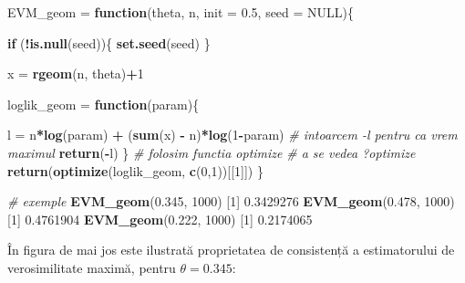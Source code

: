 \documentclass[]{article}
\newenvironment{Shaded}{\begin{snugshade}}{\end{snugshade}}
\newcommand{\KeywordTok}[1]{\textcolor[rgb]{0.13,0.29,0.53}{\textbf{#1}}}
\newcommand{\DataTypeTok}[1]{\textcolor[rgb]{0.13,0.29,0.53}{#1}}
\newcommand{\DecValTok}[1]{\textcolor[rgb]{0.00,0.00,0.81}{#1}}
\newcommand{\FloatTok}[1]{\textcolor[rgb]{0.00,0.00,0.81}{#1}}
\newcommand{\StringTok}[1]{\textcolor[rgb]{0.31,0.60,0.02}{#1}}
\newcommand{\CommentTok}[1]{\textcolor[rgb]{0.56,0.35,0.01}{\textit{#1}}}
\newcommand{\OtherTok}[1]{\textcolor[rgb]{0.56,0.35,0.01}{#1}}
\newcommand{\ControlFlowTok}[1]{\textcolor[rgb]{0.13,0.29,0.53}{\textbf{#1}}}
\newcommand{\OperatorTok}[1]{\textcolor[rgb]{0.81,0.36,0.00}{\textbf{#1}}}
\newcommand{\NormalTok}[1]{#1}
\begin{document}
\begin{Shaded}
\begin{Highlighting}[]
\NormalTok{EVM_geom =}\StringTok{ }\ControlFlowTok{function}\NormalTok{(theta, n, }\DataTypeTok{init =} \FloatTok{0.5}\NormalTok{, }\DataTypeTok{seed =} \OtherTok{NULL}\NormalTok{)\{}
  
  \ControlFlowTok{if}\NormalTok{ (}\OperatorTok{!}\KeywordTok{is.null}\NormalTok{(seed))\{}
    \KeywordTok{set.seed}\NormalTok{(seed)}
\NormalTok{  \}}
  
\NormalTok{  x =}\StringTok{ }\KeywordTok{rgeom}\NormalTok{(n, theta)}\OperatorTok{+}\DecValTok{1}
  
\NormalTok{  loglik_geom =}\StringTok{ }\ControlFlowTok{function}\NormalTok{(param)\{}
    
\NormalTok{    l =}\StringTok{ }\NormalTok{n}\OperatorTok{*}\KeywordTok{log}\NormalTok{(param) }\OperatorTok{+}\StringTok{ }\NormalTok{(}\KeywordTok{sum}\NormalTok{(x) }\OperatorTok{-}\StringTok{ }\NormalTok{n)}\OperatorTok{*}\KeywordTok{log}\NormalTok{(}\DecValTok{1}\OperatorTok{-}\NormalTok{param)}
    \CommentTok{# intoarcem -l pentru ca vrem maximul}
    \KeywordTok{return}\NormalTok{(}\OperatorTok{-}\NormalTok{l)}
\NormalTok{  \}}
  \CommentTok{# folosim functia optimize}
  \CommentTok{# a se vedea ?optimize}
  \KeywordTok{return}\NormalTok{(}\KeywordTok{optimize}\NormalTok{(loglik_geom, }\KeywordTok{c}\NormalTok{(}\DecValTok{0}\NormalTok{,}\DecValTok{1}\NormalTok{))[[}\DecValTok{1}\NormalTok{]])}
\NormalTok{\}}

\CommentTok{# exemple}
\KeywordTok{EVM_geom}\NormalTok{(}\FloatTok{0.345}\NormalTok{, }\DecValTok{1000}\NormalTok{)}
\NormalTok{[}\DecValTok{1}\NormalTok{] }\FloatTok{0.3429276}
\KeywordTok{EVM_geom}\NormalTok{(}\FloatTok{0.478}\NormalTok{, }\DecValTok{1000}\NormalTok{)}
\NormalTok{[}\DecValTok{1}\NormalTok{] }\FloatTok{0.4761904}
\KeywordTok{EVM_geom}\NormalTok{(}\FloatTok{0.222}\NormalTok{, }\DecValTok{1000}\NormalTok{)}
\NormalTok{[}\DecValTok{1}\NormalTok{] }\FloatTok{0.2174065}
\end{Highlighting}
\end{Shaded}

În figura de mai jos este ilustrată proprietatea de consistență a
estimatorului de verosimilitate maximă, pentru \(\theta = 0.345\):
\end{document}
